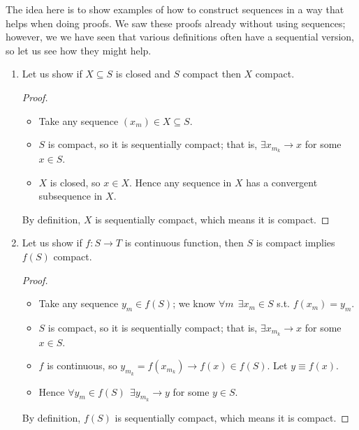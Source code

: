 \documentclass{article}
\begin{document}
The idea here is to show examples of how to construct sequences in a way that helps when doing proofs. We saw these proofs already without using sequences; however, we we have seen that various definitions often have a sequential version, so let us see how they might help.
\begin{enumerate}
  \item Let us show if $X \subseteq S$ is closed and $S$ compact then $X$ compact.
    \begin{proof}
      \begin{itemize}[label=$\bullet$]
        \item Take any sequence $(x_m) \in X \subseteq S$.

        \item $S$ is compact, so it is sequentially compact; that is, $\exists x_{m_k} \to x$ for some $x \in S$.

        \item $X$ is closed, so $x \in X$. Hence any sequence in $X$ has a convergent subsequence in $X$.
      \end{itemize}

      By definition, $X$ is sequentially compact, which means it is compact.
    \end{proof}

  \item Let us show if $f: S \to T$ is continuous function, then $S$ is compact implies $f(S)$ compact.
    \begin{proof}
      \begin{itemize}[label=$\bullet$]
        \item Take any sequence $y_m \in f(S)$; we know $\forall m ~~ \exists x_m \in S$ s.t. $f(x_m) = y_m$.

        \item $S$ is compact, so it is sequentially compact; that is, $\exists x_{m_k} \to x$ for some $x \in S$.

        \item $f$ is continuous, so $y_{m_k} = f(x_{m_k}) \to f(x) \in f(S)$. Let $y \equiv f(x)$.

        \item Hence $\forall y_m \in f(S) ~~ \exists y_{m_k} \to y$ for some $y \in S$.
      \end{itemize}

      By definition, $f(S)$ is sequentially compact, which means it is compact.
    \end{proof}


\end{enumerate}
\end{document}
